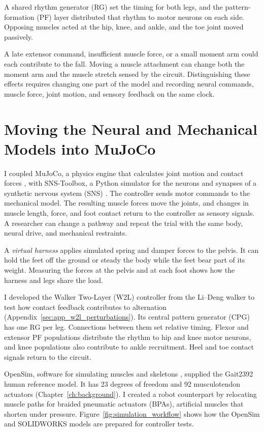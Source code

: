 A shared rhythm generator (RG) set the timing for both legs, and the pattern-formation (PF) layer distributed that rhythm to motor neurons on each side. Opposing muscles acted at the hip, knee, and ankle, and the toe joint moved passively.

A late extensor command, insufficient muscle force, or a small moment arm could each contribute to the fall. Moving a muscle attachment can change both the moment arm and the muscle stretch sensed by the circuit. Distinguishing these effects requires changing one part of the model and recording neural commands, muscle force, joint motion, and sensory feedback on the same clock.

\section{Moving the Neural and Mechanical Models into MuJoCo}\label{sec:preliminary_sim_methods}\label{sec:sns_existing_tools}\label{sec:sns_gait_comparison_main}

I coupled MuJoCo, a physics engine that calculates joint motion and contact forces \citep{todorov_mujoco_2012}, with SNS-Toolbox, a Python simulator for the neurons and synapses of a synthetic nervous system (SNS) \citep{nourse_sns_2023}. The controller sends motor commands to the mechanical model. The resulting muscle forces move the joints, and changes in muscle length, force, and foot contact return to the controller as sensory signals. A researcher can change a pathway and repeat the trial with the same body, neural drive, and mechanical restraints.

A \emph{virtual harness} applies simulated spring and damper forces to the pelvis. It can hold the feet off the ground or steady the body while the feet bear part of its weight. Measuring the forces at the pelvis and at each foot shows how the harness and legs share the load.

I developed the Walker Two-Layer (W2L) controller from the Li--Deng walker to test how contact feedback contributes to alternation (Appendix~\ref{sec:app_w2l_perturbations}). Its central pattern generator (CPG) has one RG per leg. Connections between them set relative timing. Flexor and extensor PF populations distribute the rhythm to hip and knee motor neurons, and knee populations also contribute to ankle recruitment. Heel and toe contact signals return to the circuit.

OpenSim, software for simulating muscles and skeletons \citep{delp_opensim_2007}, supplied the Gait2392 human reference model. It has 23 degrees of freedom and 92 musculotendon actuators (Chapter~\ref{ch:background}). I created a robot counterpart by relocating muscle paths for braided pneumatic actuators (BPAs), artificial muscles that shorten under pressure. Figure~\ref{fig:simulation_workflow} shows how the OpenSim and SOLIDWORKS models are prepared for controller tests.

